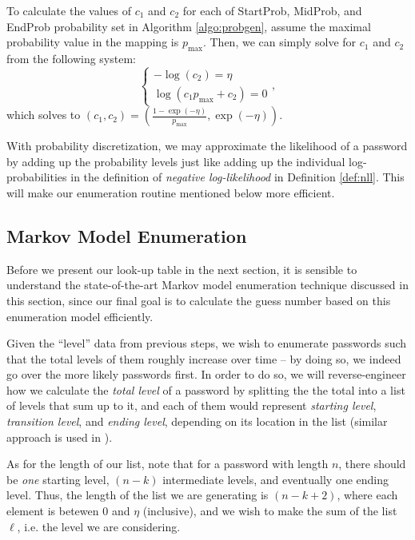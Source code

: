 \documentclass{article} %
\theoremstyle{definition}
\theoremstyle{theorem}
\theoremstyle{remark}
\theoremstyle{remark}
\begin{document}
\par\quad To calculate the values of $c_1$ and $c_2$ for each of StartProb, MidProb, and EndProb probability set in Algorithm \ref{algo:probgen}, assume the maximal probability value in the mapping is $p_{\max}$. Then, we can simply solve for $c_1$ and $c_2$ from the following system:
    \begin{equation}
        \begin{cases}
            -\log(c_2) = \eta\\
            \log(c_1 p_{\max} + c_2) = 0
        \end{cases},
    \end{equation}
which solves to $(c_1, c_2) = \left(\frac{1-\exp(-\eta)}{p_{\max}}, \exp(-\eta)\right)$.

\par\quad With probability discretization, we may approximate the likelihood of a password by adding up the probability levels just like adding up the individual log-probabilities in the definition of \emph{negative log-likelihood} in Definition \ref{def:nll}. This will make our enumeration routine mentioned below more efficient.

\subsection{Markov Model Enumeration}
\par\quad Before we present our look-up table in the next section, it is sensible to understand the state-of-the-art Markov model enumeration technique discussed in this section, since our final goal is to calculate the guess number based on this enumeration model efficiently.

\par\quad Given the ``level'' data from previous steps, we wish to enumerate passwords such that the total levels of them roughly increase over time -- by doing so, we indeed go over the more likely passwords first. In order to do so, we will reverse-engineer how we calculate the \emph{total level} of a password by splitting the the total into a list of levels that sum up to it, and each of them would represent \emph{starting level}, \emph{transition level}, and \emph{ending level}, depending on its location in the list (similar approach is used in \cite{omen}).

\par\quad As for the length of our list, note that for a password with length $n$, there should be \emph{one} starting level, $(n-k)$ intermediate levels, and eventually one ending level. Thus, the length of the list we are generating is $(n-k+2)$, where each element is betewen $0$ and $\eta$ (inclusive), and we wish to make the sum of the list $\ell$, i.e. the level we are considering.
\end{document}
